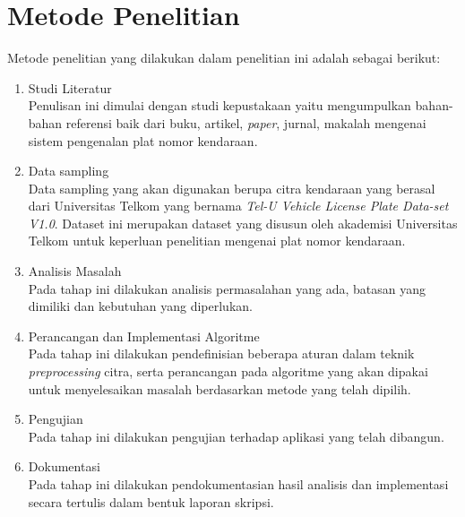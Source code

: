 \section{Metode Penelitian}
\noindent Metode penelitian yang dilakukan dalam penelitian ini adalah sebagai berikut:
\begin{enumerate}[nolistsep,leftmargin=0.5cm]
\item Studi Literatur \\
Penulisan ini dimulai dengan studi kepustakaan yaitu mengumpulkan bahan-bahan referensi baik dari buku, artikel, \textit{paper}, jurnal, makalah mengenai sistem pengenalan plat nomor kendaraan.
\item Data sampling \\
Data sampling yang akan digunakan berupa citra kendaraan yang berasal dari Universitas Telkom yang bernama \textit{Tel-U Vehicle License Plate Data-set V1.0}. Dataset ini merupakan dataset yang disusun oleh akademisi Universitas Telkom untuk keperluan penelitian mengenai plat nomor kendaraan.
\item Analisis Masalah \\
Pada tahap ini dilakukan analisis permasalahan yang ada, batasan yang dimiliki dan kebutuhan yang diperlukan.
\item Perancangan dan Implementasi Algoritme \\
Pada tahap ini dilakukan pendefinisian beberapa aturan dalam teknik \textit{preprocessing} citra, serta perancangan pada algoritme yang akan dipakai untuk menyelesaikan masalah berdasarkan metode yang telah dipilih.
\item Pengujian \\
Pada tahap ini dilakukan pengujian terhadap aplikasi yang telah dibangun.
\item Dokumentasi \\
Pada tahap ini dilakukan pendokumentasian hasil analisis dan implementasi secara tertulis dalam bentuk laporan skripsi. \\
\end{enumerate}

